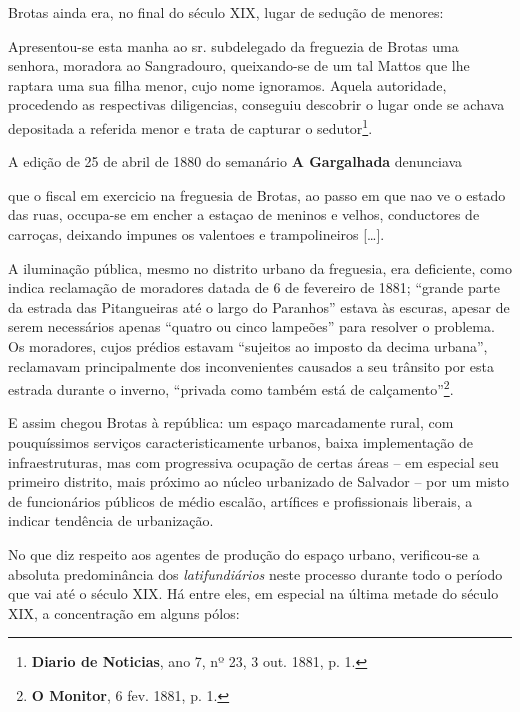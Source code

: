 Brotas ainda era, no final do século XIX, lugar de sedução de menores:

\begin{citacao}
Apresentou-se esta manha ao sr. subdelegado da freguezia de Brotas uma senhora, moradora ao Sangradouro, queixando-se de um tal Mattos que lhe raptara uma sua filha menor, cujo nome ignoramos. Aquela autoridade, procedendo as respectivas diligencias, conseguiu descobrir o lugar onde se achava depositada a referida menor e trata de capturar o sedutor\footnote{ \textbf{Diario de Noticias}, ano 7, nº 23, 3 out. 1881, p. 1.}.
\end{citacao}

A edição de 25 de abril de 1880 do semanário \textbf{A Gargalhada} denunciava

\begin{citacao}
que o fiscal em exercicio na freguesia de Brotas, ao passo em que nao ve o estado das ruas, occupa-se em encher a estaçao de meninos e velhos, conductores de carroças, deixando impunes os valentoes e trampolineiros [\dots].
\end{citacao}

A iluminação pública, mesmo no distrito urbano da freguesia, era deficiente, como indica reclamação de moradores datada de 6 de fevereiro de 1881; ``grande parte da estrada das Pitangueiras até o largo do Paranhos'' estava às escuras, apesar de serem necessários apenas ``quatro ou cinco lampeões'' para resolver o problema. Os moradores, cujos prédios estavam ``sujeitos ao imposto da decima urbana'', reclamavam principalmente dos inconvenientes causados a seu trânsito por esta estrada durante o inverno, ``privada como também está de calçamento''\footnote{\textbf{O Monitor}, 6 fev. 1881, p. 1.}.

E assim chegou Brotas à república: um espaço marcadamente rural, com pouquíssimos serviços caracteristicamente urbanos, baixa implementação de infraestruturas, mas com progressiva ocupação de certas áreas -- em especial seu primeiro distrito, mais próximo ao núcleo urbanizado de Salvador -- por um misto de funcionários públicos de médio escalão, artífices e profissionais liberais, a indicar tendência de urbanização.

No que diz respeito aos agentes de produção do espaço urbano, verificou-se a absoluta predominância dos \textit{latifundiários} neste processo durante todo o período que vai até o século XIX. Há entre eles, em especial na última metade do século XIX, a concentração em alguns pólos: 

